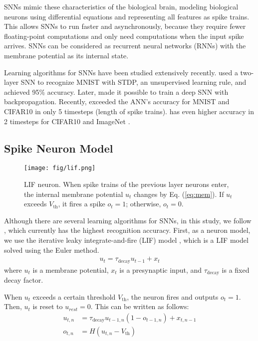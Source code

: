 \documentclass[letterpaper]{article} %
\begin{document}
SNNs mimic these characteristics of the biological brain, modeling biological neurons using differential equations and representing all features as spike trains. This allows SNNs to run faster and asynchronously, because they require fewer floating-point computations and only need computations when the input spike arrives. SNNs can be considered as recurrent neural networks (RNNs) with the membrane potential as its internal state.

Learning algorithms for SNNs have been studied extensively recently. \cite{diehlcook} used a two-layer SNN to recognize MNIST with STDP, an unsupervised learning rule, and achieved 95\% accuracy. Later, \cite{wu2019direct} made it possible to train a deep SNN with backpropagation. Recently, \cite{tsslbp} exceeded the ANN's accuracy for MNIST and CIFAR10 \cite{cifar10} in only 5 timesteps (length of spike trains). \cite{zheng2020going} has even higher accuracy in 2 timesteps for CIFAR10 and ImageNet \cite{imagenet}.

\subsection{Spike Neuron Model}

\begin{figure}[t]
    \centering
    \texttt{[image: fig/lif.png]} 
    \caption{LIF neuron. When spike trains of the previous layer neurons enter, the internal membrane potential $u_t$ changes by Eq. (\ref{eq:mem}). If $u_t$ exceeds $V_{\mathrm{th}}$, it fires a spike $o_t = 1$; otherwise, $o_t = 0$.}
    \label{fig:lif}
\end{figure}

Although there are several learning algorithms for SNNs, in this study, we follow \cite{zheng2020going}, which currently has the highest recognition accuracy. First, as a neuron model, we use the iterative leaky integrate-and-fire (LIF) model \cite{wu2019direct}, which is a LIF model \cite{lif} solved using the Euler method.
\begin{align}
    u_t = \tau_{\mathrm{decay}} u_{t-1} + x_t
\end{align}
\noindent where $u_t$ is a membrane potential, $x_t$ is a presynaptic input, and $\tau_{\mathrm{decay}}$ is a fixed decay factor.

When $u_t$ exceeds a certain threshold $V_{\mathrm{th}}$, the neuron fires and outputs $o_t=1$. Then, $u_t$ is reset to $u_{rest}=0$. This can be written as follows:
\begin{align}
    u_{t,n} &= \tau_{\mathrm{decay}} u_{t-1,n}(1-o_{t-1,n}) + x_{t,n-1} \label{eq:mem}\\
    o_{t,n} &= H(u_{t,n}-V_{\mathrm{th}}) \label{eq:heaviside}
\end{align}
\end{document}
